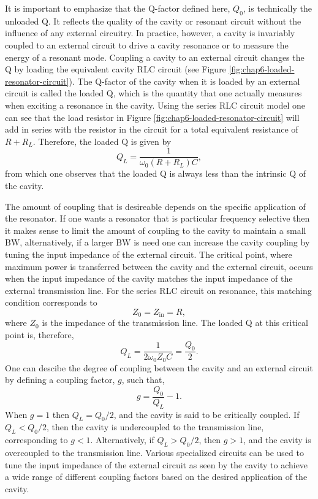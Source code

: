 It is important to emphasize that the Q-factor defined here, $Q_0$, is technically the unloaded Q. It reflects the quality of the cavity or resonant circuit without the influence of any external circuitry. In practice, however, a cavity is invariably coupled to an external circuit to drive a cavity resonance or to measure the energy of a resonant mode. Coupling a cavity to an external circuit changes the Q by loading the equivalent cavity RLC circuit (see Figure \ref{fig:chap6-loaded-resonator-circuit}). The Q-factor of the cavity when it is loaded by an external circuit is called the loaded Q, which is the quantity that one actually measures when exciting a resonance in the cavity. Using the series RLC circuit model one can see that the load resistor in Figure \ref{fig:chap6-loaded-resonator-circuit} will add in series with the resistor in the circuit for a total equivalent resistance of $R+R_L$. Therefore, the loaded Q is given by 
\begin{equation}
    Q_L=\frac{1}{\omega_0(R+R_L)C},
\end{equation}
from which one observes that the loaded Q is always less than the intrinsic Q of the cavity.

The amount of coupling that is desireable depends on the specific application of the resonator. If one wants a resonator that is particular frequency selective then it makes sense to limit the amount of coupling to the cavity to maintain a small BW, alternatively, if a larger BW is need one can increase the cavity coupling by tuning the input impedance of the external circuit. The critical point, where maximum power is transferred between the cavity and the external circuit, occurs when the input impedance of the cavity matches the input impedance of the external transmission line.  For the series RLC circuit on resonance, this matching condition corresponds to 
\begin{equation}
    Z_0=Z_\mathrm{in}=R,
\end{equation}
where $Z_0$ is the impedance of the transmission line. The loaded Q at this critical point is, therefore,
\begin{equation}
    Q_L=\frac{1}{2\omega_0Z_0C}=\frac{Q_0}{2}.
\end{equation}
One can descibe the degree of coupling between the cavity and an external circuit by defining a coupling factor, $g$, such that,
\begin{equation}
    g=\frac{Q_0}{Q_L}-1.
    \label{eq:chap6-coupling-factor}
\end{equation} 
When $g=1$ then $Q_L=Q_0/2$, and the cavity is said to be critically coupled. If $Q_L<Q_0/2$, then the cavity is undercoupled to the transmission line, corresponding to $g<1$. Alternatively, if $Q_L>Q_0/2$, then $g>1$, and the cavity is overcoupled to the transmission line. Various specialized circuits can be used to tune the input impedance of the external circuit as seen by the cavity to achieve a wide range of different coupling factors based on the desired application of the cavity.

